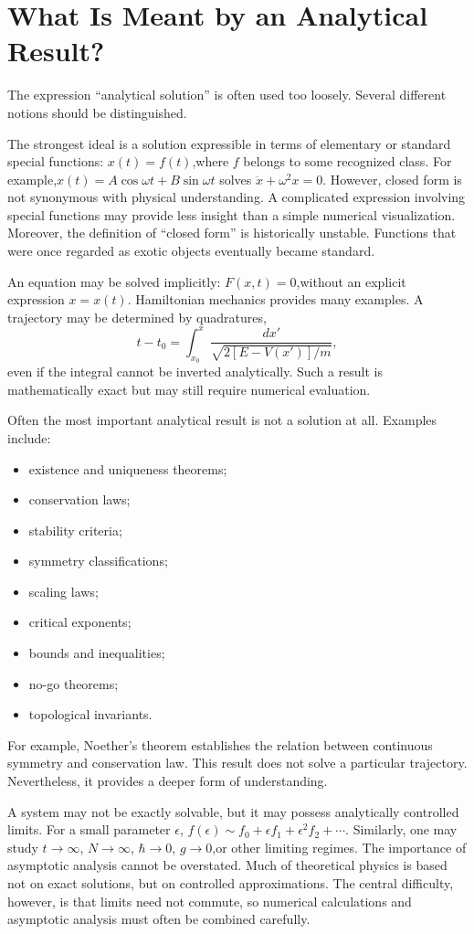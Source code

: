 \section{ What Is Meant by an Analytical Result?}
The expression ``analytical solution'' is often used too loosely. Several
different notions should be distinguished.

The strongest ideal is a solution expressible in terms of elementary or standard special functions:
$x(t)=f(t)$,where $f$ belongs to some recognized class.
For example,$x(t)=A\cos\omega t+B\sin\omega t$ solves $\ddot{x}+\omega^2x=0$.
However, closed form is not synonymous with physical understanding. A
complicated expression involving special functions may provide less insight
than a simple numerical visualization.
Moreover, the definition of ``closed form'' is historically unstable. Functions
that were once regarded as exotic objects eventually became standard.

An equation may be solved implicitly: $F(x,t)=0$,without an explicit expression $x=x(t)$.
Hamiltonian mechanics provides many examples. A trajectory may be determined by quadratures,
\[t-t_0=\int_{x_0}^{x}\frac{dx'}{\sqrt{2[E-V(x')]/m}},\]
even if the integral cannot be inverted analytically.
Such a result is mathematically exact but may still require numerical evaluation.

Often the most important analytical result is not a solution at all.
Examples include:
\begin{itemize}
   \item  existence and uniqueness theorems;
   \item  conservation laws;
   \item  stability criteria;
   \item  symmetry classifications;
   \item  scaling laws;
   \item  critical exponents;
   \item  bounds and inequalities;
   \item  no-go theorems;
   \item  topological invariants.
\end{itemize}
For example, Noether's theorem establishes the relation between continuous symmetry
and conservation law. This result does not solve a particular trajectory. Nevertheless, 
it provides a deeper form of understanding.

A system may not be exactly solvable, but it may possess analytically controlled limits.
For a small parameter $\epsilon$, $f(\epsilon)\sim f_0+\epsilon f_1+\epsilon^2 f_2+\cdots$.
Similarly, one may study $t\rightarrow\infty$, $N\rightarrow\infty$, $\hbar\rightarrow 0$,
$g\rightarrow 0$,or other limiting regimes.
The importance of asymptotic analysis cannot be overstated. Much of theoretical physics is based not 
on exact solutions, but on controlled approximations.
The central difficulty, however, is that limits need not commute, %
so numerical calculations and asymptotic analysis must often be combined carefully.

